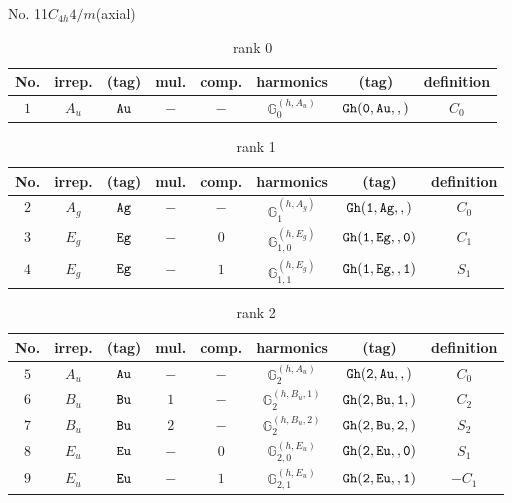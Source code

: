 \documentclass[fleqn,8pt]{jsarticle}
\begin{document}
\setcounter{MaxMatrixCols}{16}

\begin{center}
\LARGE
No. 11\quad$C_{4h}$\quad$4/m$\quad[ tetragonal ] (axial)
\end{center}
\begin{table}[ht!]
\begin{center}
\caption{rank 0}
\renewcommand{\arraystretch}{1.3}
\begin{tabular}{cccccccc} \hline \hline
No. & irrep. & (tag) & mul. & comp. & harmonics & (tag) & definition \\ \hline
$ 1 $ & $ A_{u} $ & $ {\tt Au} $ & $ - $ & $ - $ & $ \mathbb{G}_{0}^{(h,A_{u})} $ & $ {\tt Gh(0,Au,,)} $ & $ C_{0} $ \\
 \hline \hline
\end{tabular}
\end{center}
\end{table}
\begin{table}[ht!]
\begin{center}
\caption{rank 1}
\renewcommand{\arraystretch}{1.3}
\begin{tabular}{cccccccc} \hline \hline
No. & irrep. & (tag) & mul. & comp. & harmonics & (tag) & definition \\ \hline
$ 2 $ & $ A_{g} $ & $ {\tt Ag} $ & $ - $ & $ - $ & $ \mathbb{G}_{1}^{(h,A_{g})} $ & $ {\tt Gh(1,Ag,,)} $ & $ C_{0} $ \\
$ 3 $ & $ E_{g} $ & $ {\tt Eg} $ & $ - $ & $ 0 $ & $ \mathbb{G}_{1,0}^{(h,E_{g})} $ & $ {\tt Gh(1,Eg,,0)} $ & $ C_{1} $ \\
$ 4 $ & $ E_{g} $ & $ {\tt Eg} $ & $ - $ & $ 1 $ & $ \mathbb{G}_{1,1}^{(h,E_{g})} $ & $ {\tt Gh(1,Eg,,1)} $ & $ S_{1} $ \\
 \hline \hline
\end{tabular}
\end{center}
\end{table}
\begin{table}[ht!]
\begin{center}
\caption{rank 2}
\renewcommand{\arraystretch}{1.3}
\begin{tabular}{cccccccc} \hline \hline
No. & irrep. & (tag) & mul. & comp. & harmonics & (tag) & definition \\ \hline
$ 5 $ & $ A_{u} $ & $ {\tt Au} $ & $ - $ & $ - $ & $ \mathbb{G}_{2}^{(h,A_{u})} $ & $ {\tt Gh(2,Au,,)} $ & $ C_{0} $ \\
$ 6 $ & $ B_{u} $ & $ {\tt Bu} $ & $ 1 $ & $ - $ & $ \mathbb{G}_{2}^{(h,B_{u},1)} $ & $ {\tt Gh(2,Bu,1,)} $ & $ C_{2} $ \\
$ 7 $ & $ B_{u} $ & $ {\tt Bu} $ & $ 2 $ & $ - $ & $ \mathbb{G}_{2}^{(h,B_{u},2)} $ & $ {\tt Gh(2,Bu,2,)} $ & $ S_{2} $ \\
$ 8 $ & $ E_{u} $ & $ {\tt Eu} $ & $ - $ & $ 0 $ & $ \mathbb{G}_{2,0}^{(h,E_{u})} $ & $ {\tt Gh(2,Eu,,0)} $ & $ S_{1} $ \\
$ 9 $ & $ E_{u} $ & $ {\tt Eu} $ & $ - $ & $ 1 $ & $ \mathbb{G}_{2,1}^{(h,E_{u})} $ & $ {\tt Gh(2,Eu,,1)} $ & $ - C_{1} $ \\
 \hline \hline
\end{tabular}
\end{center}
\end{table}
\end{document}
